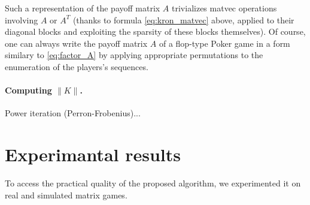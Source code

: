 \documentclass{article} %
\begin{document}
Such a representation of the payoff matrix $A$ trivializes matvec
operations involving $A$ or $A^T$ (thanks to formula
\eqref{eq:kron_matvec} above, applied to their diagonal blocks and
exploiting the sparsity of these blocks themselves). Of course, one
can always write the payoff matrix $A$ of a flop-type Poker game in a
form similary to \eqref{eq:factor_A} by applying appropriate
permutations to the enumeration of the players's sequences.

\paragraph{\textbf{Computing $\|K\|$.}} Power iteration (Perron-Frobenius)...

\section{Experimantal results}
\label{sec:results}
To access the practical quality of the proposed algorithm, we
experimented it on real and simulated matrix games.
\end{document}
